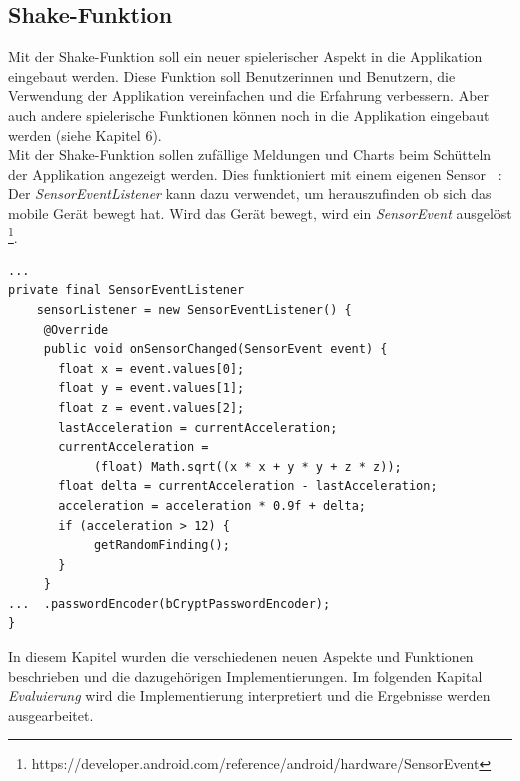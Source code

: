 \subsection{Shake-Funktion}
Mit der Shake-Funktion soll ein neuer spielerischer Aspekt in die Applikation eingebaut werden. Diese Funktion soll Benutzerinnen und Benutzern, die Verwendung der Applikation vereinfachen und die Erfahrung verbessern. Aber auch andere spielerische Funktionen können noch in die Applikation eingebaut werden (siehe Kapitel 6). \\
Mit der Shake-Funktion sollen zufällige Meldungen und Charts beim Schütteln der Applikation angezeigt werden. Dies funktioniert mit einem eigenen Sensor ~\parencite{borckanalyse}: Der \textit{SensorEventListener } kann dazu verwendet, um herauszufinden ob sich das mobile Gerät bewegt hat. Wird das Gerät bewegt, wird ein \textit{SensorEvent} ausgelöst \footnote{https://developer.android.com/reference/android/hardware/SensorEvent}. 
\lstset{
  caption=[Listing für die Implementierung des SensorEventListener.]{Listing für die Implementierung des SensorEventListener. Reagiert der Sensor auf eine Bewegung, wird das Event ausgelöst. Mit der Berechnung der \textit{Acceleration} wird festgestellt, ob sich das mobile Gerät schnell genug bewegt hat und so ob die Shake-Funktion bewusst ausgeführt werden soll. Sonst würde das Event auch bei kleinsten Bewegungen reagieren. Ist die Beschleunigung schnell genug, so wird eine zufällige Meldung geladen.},
  basicstyle=\small\ttfamily, 
  label=lst:config, 
  language=Java,
  frame=single,
  breaklines=true, %
  postbreak=\mbox{\textcolor{red}{$\hookrightarrow$}\space},
}

\begin{samepage}%
	\begin{lstlisting}[float=tbhp]
...
private final SensorEventListener 
    sensorListener = new SensorEventListener() {
     @Override
     public void onSensorChanged(SensorEvent event) {
       float x = event.values[0];
       float y = event.values[1];
       float z = event.values[2];
       lastAcceleration = currentAcceleration;
       currentAcceleration = 
            (float) Math.sqrt((x * x + y * y + z * z));
       float delta = currentAcceleration - lastAcceleration;
       acceleration = acceleration * 0.9f + delta;
       if (acceleration > 12) {
            getRandomFinding();
       }
     }
...  .passwordEncoder(bCryptPasswordEncoder);
}
	\end{lstlisting}
\end{samepage}

In diesem Kapitel wurden die verschiedenen neuen Aspekte und Funktionen beschrieben und die dazugehörigen Implementierungen. Im folgenden Kapital \textit{Evaluierung} wird die Implementierung interpretiert und die Ergebnisse werden ausgearbeitet.

\chapterend